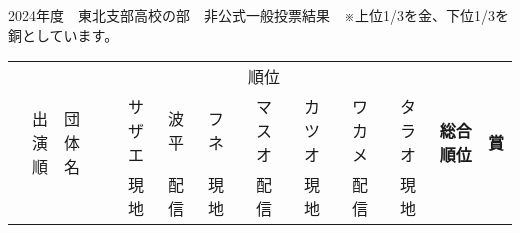 \documentclass[11pt,a4paper,landscape,twoside,openany,english,uplatex]{jsarticle}
\begin{document}
2024年度　東北支部高校の部　非公式一般投票結果　※上位1/3を金、下位1/3を銅としています。
\begin{table}[h]
 \centering
 \begin{tabular}{r|l|rrrrrrr|r|c}
  \hline
  \multirow{3}{*}{出演順} & \multirow{3}{*}{団体名} & \multicolumn{7}{|c|}{順位} & \multirow{3}{*}{\textbf{総合順位}} &  \multirow{3}{*}{\textbf{賞}} \\
  \cline{3-9} %
    &  & サザエ & 波平 & フネ & マスオ &  カツオ & ワカメ & タラオ &  &  \\
    &  & 現地   & 配信 & 現地 & 配信   &  現地   & 配信   & 現地   &  &  \\
  \hline \hline

\end{tabular}
\end{table}
\end{document}
